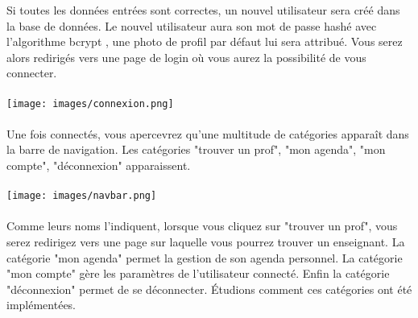 \documentclass{article}%
\begin{document}
Si toutes les données entrées sont correctes, un nouvel utilisateur sera créé dans la base de données. Le nouvel utilisateur aura son mot de passe hashé avec l’algorithme bcrypt , une photo de profil par défaut lui sera attribué.
Vous serez alors redirigés vers une page de login où vous aurez la possibilité de vous connecter.\\\\
\texttt{[image: images/connexion.png]}\\\\
Une fois connectés, vous apercevrez qu'une multitude de catégories apparaît dans la barre de navigation. Les catégories "trouver un prof", "mon agenda", "mon compte", "déconnexion" apparaissent. \\\\
\texttt{[image: images/navbar.png]}
\\\\
 Comme leurs noms l'indiquent, lorsque vous cliquez sur "trouver un prof", vous serez redirigez vers une page sur laquelle vous pourrez trouver un enseignant. La catégorie "mon agenda" permet la gestion de son agenda personnel. La catégorie "mon compte" gère les paramètres de l'utilisateur connecté. Enfin la catégorie "déconnexion" permet de se déconnecter. Étudions comment ces catégories ont été implémentées. \\\\
\end{document}
